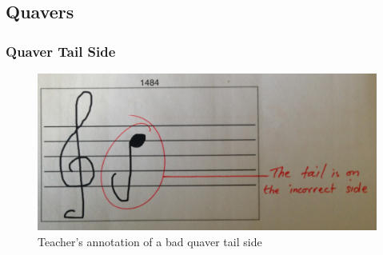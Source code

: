 \subsection{Quavers}

\subsubsection{Quaver Tail Side}

\begin{figure}[H]
  \includegraphics[width=\linewidth]{gfx/photos/teacher-bad-quavertail-side.jpg}
  \caption{Teacher's annotation of a bad quaver tail side}
  \label{fig:teacher-example-quaver-wrong-side}
\end{figure}
